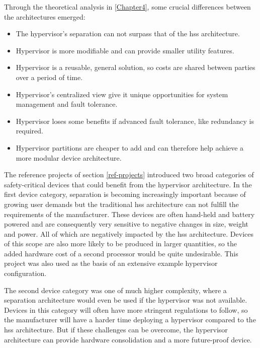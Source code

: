 Through the theoretical analysis in \ref{Chapter4}, some crucial differences between the architectures emerged:
\begin{itemize}
    \item The hypervisor's separation can not surpass that of the \acrshort{hss} architecture.
    \item Hypervisor is more modifiable and can provide smaller utility features.
    \item Hypervisor is a reusable, general solution, so costs are shared between parties over a period of time.
    \item Hypervisor's centralized view give it unique opportunities for system management and fault tolerance.
    \item Hypervisor loses some benefits if advanced fault tolerance, like redundancy is required.
    \item Hypervisor partitions are cheaper to add and can therefore help achieve a more modular device architecture.
\end{itemize}

The reference projects of section \ref{ref-projects} introduced two broad categories of safety-critical devices that could benefit from the hypervisor architecture. In the first device category, separation is becoming increasingly important because of growing user demands but the traditional \acrshort{hss} architecture can not fulfill the requirements of the manufacturer. These devices are often hand-held and battery powered and are consequently very sensitive to negative changes in size, weight and power. All of which are negatively impacted by the \acrshort{hss} architecture.
Devices of this scope are also more likely to be produced in larger quantities, so the added hardware cost of a second processor would be quite undesirable. This project was also used as the basis of an extensive example hypervisor configuration.

The second device category was one of much higher complexity, where a separation architecture would even be used if the hypervisor was not available. Devices in this category will often have more stringent regulations to follow, so the manufacturer will have a harder time deploying a hypervisor compared to the \acrshort{hss} architecture. But if these challenges can be overcome, the hypervisor architecture can provide hardware consolidation and a more future-proof device.

